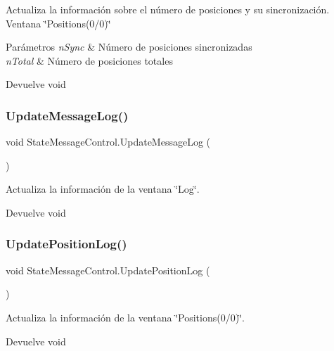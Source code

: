 Actualiza la información sobre el número de posiciones y su sincronización. Ventana \char`\"{}\+Positions(0/0)\char`\"{} 
\begin{DoxyParams}{Parámetros}
{\em n\+Sync} & Número de posiciones sincronizadas \\
\hline
{\em n\+Total} & Número de posiciones totales \\
\hline
\end{DoxyParams}
\begin{DoxyReturn}{Devuelve}
void 
\end{DoxyReturn}
\mbox{\label{class_state_message_control_af56933aa9a5a8d7d2c1e5fd515ec65e8}} 
\subsubsection{\texorpdfstring{UpdateMessageLog()}{UpdateMessageLog()}}
{\footnotesize\ttfamily void State\+Message\+Control.\+Update\+Message\+Log (\begin{DoxyParamCaption}{ }\end{DoxyParamCaption})\hspace{0.3cm}{\ttfamily [inline]}}

Actualiza la información de la ventana \char`\"{}\+Log\char`\"{}. \begin{DoxyReturn}{Devuelve}
void 
\end{DoxyReturn}
\mbox{\label{class_state_message_control_aeace074591852cb0cc7125520bc49817}} 
\subsubsection{\texorpdfstring{UpdatePositionLog()}{UpdatePositionLog()}}
{\footnotesize\ttfamily void State\+Message\+Control.\+Update\+Position\+Log (\begin{DoxyParamCaption}{ }\end{DoxyParamCaption})\hspace{0.3cm}{\ttfamily [inline]}}

Actualiza la información de la ventana \char`\"{}\+Positions(0/0)\char`\"{}. \begin{DoxyReturn}{Devuelve}
void 
\end{DoxyReturn}
\mbox{\label{class_state_message_control_a0b0830fc3f8fe9d578fce4b3d944cde6}} 
